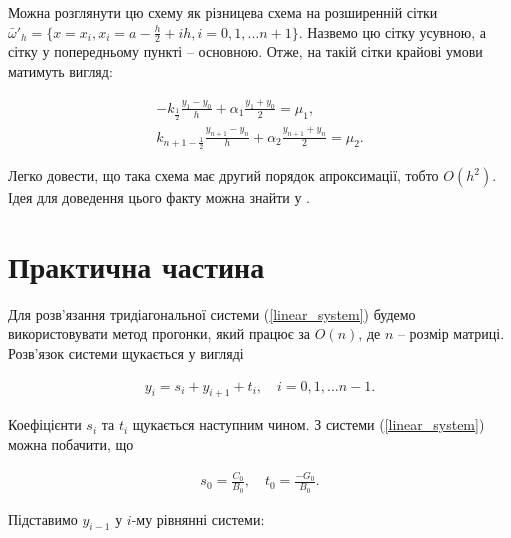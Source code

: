 Можна розглянути цю схему як різницева схема на розширенній сітки \( \bar{\omega}'_h = \{ x = x_i, x_i = a - \frac{h}{2} + ih, i = 0, 1, \dots n+1\}\). Назвемо цю сітку усувною, а сітку у попередньому пункті -- основною. Отже, на такій сітки крайові умови матимуть вигляд:

\begin{equation}
\begin{multlined} \label{diff:boundary_extended}
-k_{\frac{1}{2}} \frac{y_{1} - y_{0}}{h} + \alpha_1 \frac{y_{1} + y_{0}}{2} = \mu_1, \\
k_{n+1-\frac{1}{2}} \frac{y_{n+1} - y_{n}}{h} + \alpha_2 \frac{y_{n+1} + y_{n}}{2} = \mu_2.
\end{multlined}
\end{equation}


 Легко довести, що така схема має другий порядок апроксимації, тобто \( O(h^2)\). Ідея для доведення цього факту можна знайти у \cite[с. 148--149]{Samarskii71}.



\section{Практична частина}

Для розв'язання тридіагональної системи (\ref{linear_system}) будемо використовувати метод прогонки, який працює за \(O(n)\), де \( n \) -- розмір матриці. Розв'язок системи щукається у вигляді

\begin{equation}
\begin{multlined} \label{diff:solve_tridiag}
y_i = s_i + y_{i+1} + t_i, \quad i = 0, 1, \dots n-1.
\end{multlined}
\end{equation}

Коефіцієнти \(s_i\) та \(t_i\) щукається наступним чином. З системи (\ref{linear_system}) можна побачити, що

\begin{equation}
\begin{multlined} 
s_0 = \frac{C_0}{B_0}, \quad t_0 = \frac{-G_0}{B_0}.
\end{multlined}
\end{equation}

Підставимо \( y_{i-1} \) у \(i\)-му рівнянні системи:

